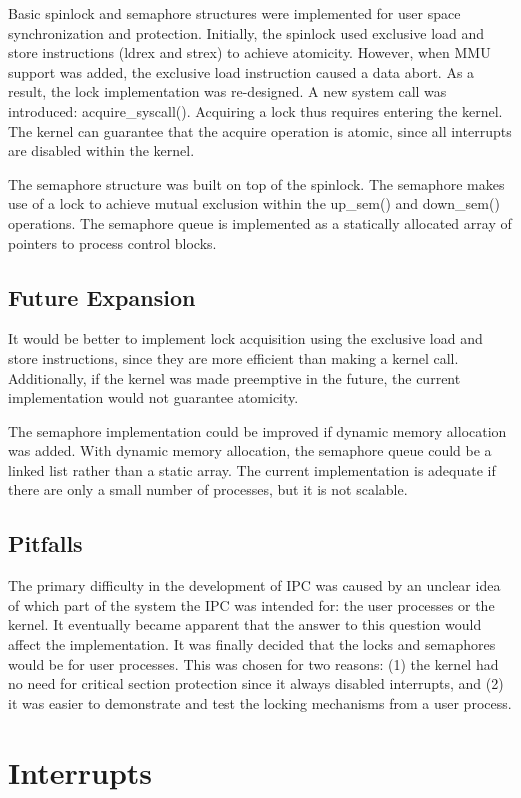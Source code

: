 \documentclass[12pt]{article}
\begin{document}
Basic spinlock and semaphore structures were implemented for user space
synchronization and protection. Initially, the spinlock used exclusive load and
store instructions (ldrex and strex) to achieve atomicity. However, when MMU
support was added, the exclusive load instruction caused a data abort. As a
result, the lock implementation was re-designed. A new system call was
introduced: acquire\_syscall(). Acquiring a lock thus requires entering the
kernel. The kernel can guarantee that the acquire operation is atomic, since all
interrupts are disabled within the kernel.

The semaphore structure was built on top of the spinlock. The semaphore makes
use of a lock to achieve mutual exclusion within the up\_sem() and down\_sem()
operations. The semaphore queue is implemented as a statically allocated array
of pointers to process control blocks.


\subsection{Future Expansion}
It would be better to implement lock acquisition using the exclusive load
and store instructions, since they are more efficient than making a kernel call.
Additionally, if the kernel was made preemptive in the future, the current
implementation would not guarantee atomicity.

The semaphore implementation could be improved if dynamic memory allocation
was added. With dynamic memory allocation, the semaphore queue could be a linked
list rather than a static array. The current implementation is adequate if
there are only a small number of processes, but it is not scalable.

\subsection{Pitfalls}
The primary difficulty in the development of IPC was caused by 
an unclear idea of which part of the system the IPC was intended for: the
user processes or the kernel. It eventually became apparent that the 
answer to this question would affect the implementation. It was
finally decided that the locks and semaphores would be for user processes.
This was chosen for two reasons: (1) the kernel had no need for critical
section protection since it always disabled interrupts, and (2) it was
easier to demonstrate and test the locking mechanisms from a user 
process.


\section{Interrupts}
\end{document}
